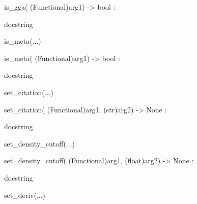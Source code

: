 \documentclass[letterpaper,10pt,english]{sphinxmanual}
\begin{document}
\begin{description}
\begin{description}
\begin{DUlineblock}{0em}
\begin{DUlineblock}{\DUlineblockindent}
\item[] is\_gga( (Functional)arg1) -\textgreater{} bool :
\item[]
\begin{DUlineblock}{\DUlineblockindent}
\item[] docstring
\item[] 
\end{DUlineblock}
\end{DUlineblock}
\item[] is\_meta(...)
\item[]
\begin{DUlineblock}{\DUlineblockindent}
\item[] is\_meta( (Functional)arg1) -\textgreater{} bool :
\item[]
\begin{DUlineblock}{\DUlineblockindent}
\item[] docstring
\item[] 
\end{DUlineblock}
\end{DUlineblock}
\item[] set\_citation(...)
\item[]
\begin{DUlineblock}{\DUlineblockindent}
\item[] set\_citation( (Functional)arg1, (str)arg2) -\textgreater{} None :
\item[]
\begin{DUlineblock}{\DUlineblockindent}
\item[] docstring
\item[] 
\end{DUlineblock}
\end{DUlineblock}
\item[] set\_density\_cutoff(...)
\item[]
\begin{DUlineblock}{\DUlineblockindent}
\item[] set\_density\_cutoff( (Functional)arg1, (float)arg2) -\textgreater{} None :
\item[]
\begin{DUlineblock}{\DUlineblockindent}
\item[] docstring
\item[] 
\end{DUlineblock}
\end{DUlineblock}
\item[] set\_deriv(...)
\item[]
\begin{DUlineblock}{\DUlineblockindent}

\end{DUlineblock}
\end{DUlineblock}
\end{description}
\end{description}
\end{document}
